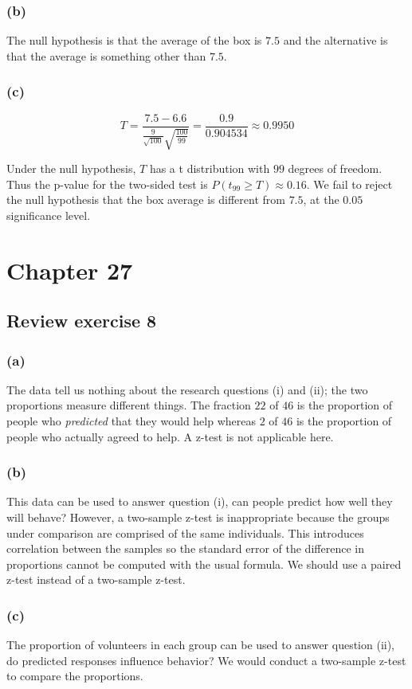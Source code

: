 \documentclass[11pt]{article}
\begin{document}
\subsubsection{(b)}
The null hypothesis is that the average of the box is $7.5$ and the alternative is that the average is something other than $7.5$.
\subsubsection{(c)}
$$T= \frac{7.5 - 6.6}{\frac{9}{\sqrt{100}}\sqrt{\frac{100}{99}}} = \frac{0.9}{0.904534} \approx 0.9950$$

Under the null hypothesis, $T$ has a t distribution with $99$ degrees of freedom.  Thus the p-value for the two-sided test is $ P(t_{99} \geq T) \approx 0.16$.  We fail to reject the null hypothesis that the box average is different from $7.5$, at the $0.05$ significance level.



\section{Chapter 27}
\subsection{Review exercise 8} %
\subsubsection{(a)}
The data tell us nothing about the research questions (i) and (ii); the two proportions measure different things.  The fraction $22$ of $46$ is the proportion of people who \textit{predicted} that they would help whereas $2$ of $46$ is the proportion of people who actually agreed to help.  A z-test is not applicable here.

\subsubsection{(b)}
This data can be used to answer question (i), can people predict how well they will behave?  However, a two-sample z-test is inappropriate because the groups under comparison are comprised of the same individuals.  This introduces correlation between the samples so the standard error of the difference in proportions cannot be computed with the usual formula.  We should use a paired z-test instead of a two-sample z-test.

\subsubsection{(c)}
The proportion of volunteers in each group can be used to answer question (ii), do predicted responses influence behavior?  We would conduct a two-sample z-test to compare the proportions. \\
\end{document}

